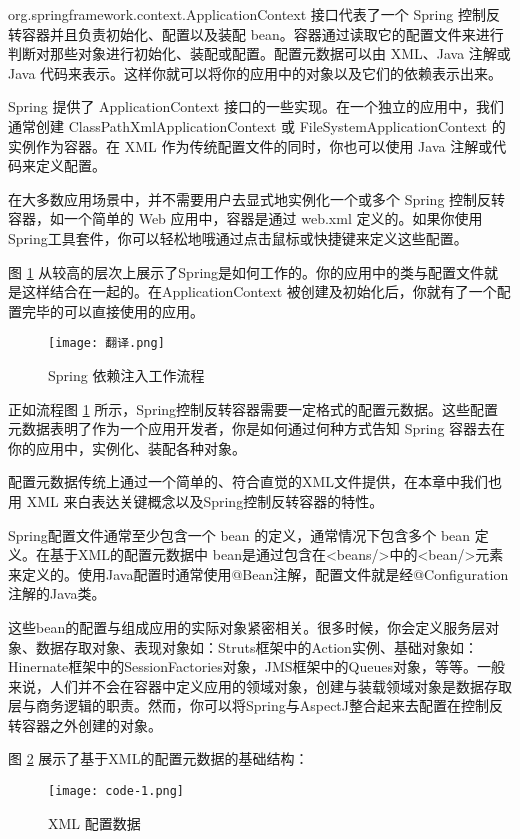 org.springframework.context.ApplicationContext 接口代表了一个 Spring 控制反转容器并且负责初始化、配置以及装配 bean。容器通过读取它的配置文件来进行判断对那些对象进行初始化、装配或配置。配置元数据可以由 XML、Java 注解或Java 代码来表示。这样你就可以将你的应用中的对象以及它们的依赖表示出来。

Spring 提供了 ApplicationContext 接口的一些实现。在一个独立的应用中，我们通常创建 ClassPathXmlApplicationContext 或 FileSystemApplicationContext 的实例作为容器。在 XML 作为传统配置文件的同时，你也可以使用 Java 注解或代码来定义配置。

在大多数应用场景中，并不需要用户去显式地实例化一个或多个 Spring 控制反转容器，如一个简单的 Web 应用中，容器是通过 web.xml 定义的。如果你使用Spring工具套件，你可以轻松地哦通过点击鼠标或快捷键来定义这些配置。

图 \ref{fig:spring-di} 从较高的层次上展示了Spring是如何工作的。你的应用中的类与配置文件就是这样结合在一起的。在ApplicationContext 被创建及初始化后，你就有了一个配置完毕的可以直接使用的应用。

\begin{figure}[!ht]
  \centering
  \texttt{[image: 翻译.png]}
  \caption{Spring 依赖注入工作流程}
  \label{fig:spring-di}
\end{figure}

正如流程图 \ref{fig:spring-di} 所示，Spring控制反转容器需要一定格式的配置元数据。这些配置元数据表明了作为一个应用开发者，你是如何通过何种方式告知 Spring 容器去在你的应用中，实例化、装配各种对象。

配置元数据传统上通过一个简单的、符合直觉的XML文件提供，在本章中我们也用 XML 来白表达关键概念以及Spring控制反转容器的特性。

Spring配置文件通常至少包含一个 bean 的定义，通常情况下包含多个 bean 定义。在基于XML的配置元数据中 bean是通过包含在<beans/>中的<bean/>元素来定义的。使用Java配置时通常使用@Bean注解，配置文件就是经@Configuration注解的Java类。

这些bean的配置与组成应用的实际对象紧密相关。很多时候，你会定义服务层对象、数据存取对象、表现对象如：Struts框架中的Action实例、基础对象如：Hinernate框架中的SessionFactories对象，JMS框架中的Queues对象，等等。一般来说，人们并不会在容器中定义应用的领域对象，创建与装载领域对象是数据存取层与商务逻辑的职责。然而，你可以将Spring与AspectJ整合起来去配置在控制反转容器之外创建的对象。

图 \ref{fig:spring-code-1} 展示了基于XML的配置元数据的基础结构：

\begin{figure}[!ht]
  \centering
  \texttt{[image: code-1.png]}
  \caption{XML 配置数据}
  \label{fig:spring-code-1}
\end{figure}

